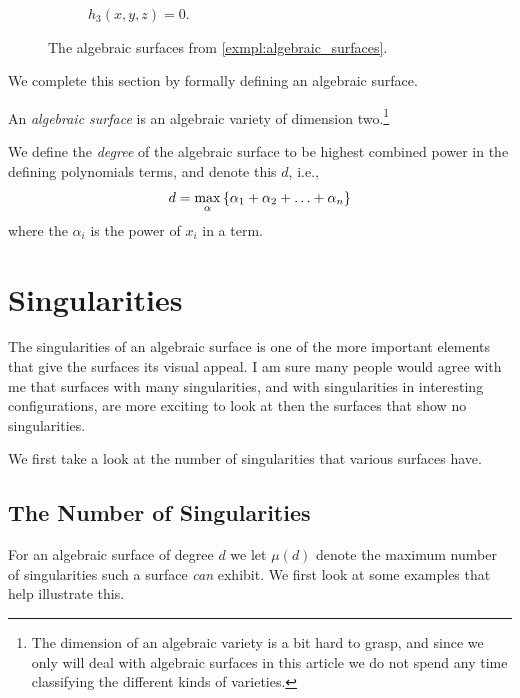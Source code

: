 \documentclass{article}
\begin{document}
\begin{example}
\begin{figure}[]
\begin{subfigure}[t]{0.3\textwidth}
            \caption{$h_3(x, y, z) = 0$.}
        \end{subfigure}
        \caption{The algebraic surfaces from \cref{exmpl:algebraic_surfaces}.}
        \label{fig:algebraic_surfaces}
    \end{figure}
\end{example}

We complete this section by formally defining an algebraic surface.
\begin{definition}
    An \emph{algebraic surface} is an
    algebraic variety of dimension two.\footnote{The dimension of an algebraic
    variety is a bit hard to grasp, and since we only will deal with
    algebraic surfaces in this article we do not spend any time classifying
    the different kinds of varieties.}

    We define the \emph{degree} of the algebraic surface
    to be highest combined power in the defining polynomials terms, and denote
    this $d$, i.e.,
    \begin{equation}
        \notag
        d = \max_{\alpha}\left\{\alpha_1 + \alpha_2 + \ldots + \alpha_n\right\}
    \end{equation}
    where the $\alpha_i$ is the power of $x_i$ in a term.
\end{definition}


\section{Singularities}
\label{sec:singularities}

The singularities of an algebraic surface is one of the more important elements
that give the surfaces its visual appeal. I am sure many people would agree
with me that surfaces with many singularities, and with singularities in
interesting configurations, are more exciting to look at then the surfaces that
show no singularities. 

We first take a look at the number of singularities that various surfaces have.

\subsection{The Number of Singularities}
\label{sub:the_number_of_singularities}

For an algebraic surface of degree $d$ we let $\mu(d)$ denote the maximum
number of singularities such a surface \emph{can} exhibit. We first look at
some examples that help illustrate this.
\end{document}

